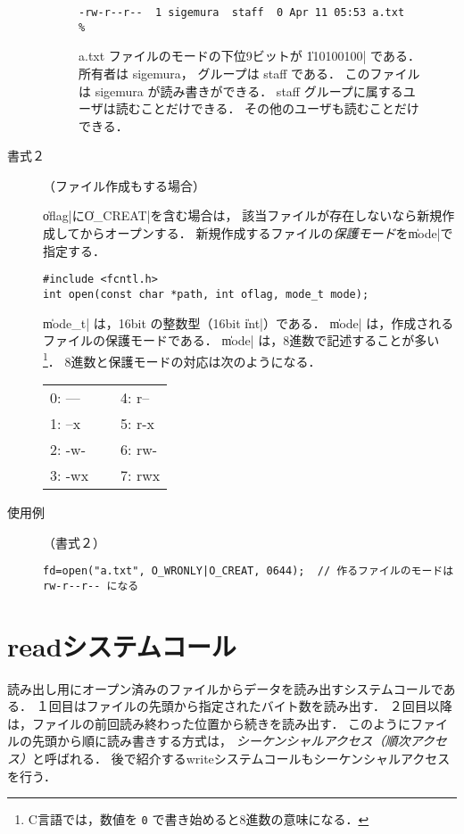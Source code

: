 \begin{description}
\begin{figure}[tb]
\begin{framed}
\begin{lstlisting}[numbers=none]
% ls -l a.txt
-rw-r--r--  1 sigemura  staff  0 Apr 11 05:53 a.txt
%
\end{lstlisting}

a.txt ファイルのモードの下位9ビットが \|110100100| である．
所有者は sigemura，
グループは staff である．
このファイルは sigemura が読み書きができる．
staff グループに属するユーザは読むことだけできる．
その他のユーザも読むことだけできる．
\end{framed}
\end{figure}

\item[書式２]（ファイル作成もする場合）

\|oflag|に\|O_CREAT|を含む場合は，
該当ファイルが存在しないなら新規作成してからオープンする．
新規作成するファイルの\emph{保護モード}を\|mode|で指定する．

\begin{lstlisting}[numbers=none]
#include <fcntl.h>
int open(const char *path, int oflag, mode_t mode);
\end{lstlisting}

\|mode_t| は，16bit の整数型（16bit \|int|）である．
\|mode| は，作成されるファイルの保護モードである．
\|mode| は，8進数で記述することが多い\footnote{
C言語では，数値を \texttt{0} で書き始めると8進数の意味になる．}．
8進数と保護モードの対応は次のようになる．

{\ttfamily\begin{center}\begin{tabular}{l l}
0: --- ~~~ & 4: r-- \\
1: --x     & 5: r-x \\
2: -w-     & 6: rw- \\
3: -wx     & 7: rwx
\end{tabular}\end{center}}

\item[使用例]（書式２）

\begin{lstlisting}[numbers=none]
fd=open("a.txt", O_WRONLY|O_CREAT, 0644);  // 作るファイルのモードは rw-r--r-- になる
\end{lstlisting}

\end{description}

\section{readシステムコール}
読み出し用にオープン済みのファイルからデータを読み出すシステムコールである．
１回目はファイルの先頭から指定されたバイト数を読み出す．
２回目以降は，ファイルの前回読み終わった位置から続きを読み出す．
このようにファイルの先頭から順に読み書きする方式は，
\emph{シーケンシャルアクセス（順次アクセス）}と呼ばれる．
後で紹介するwriteシステムコールもシーケンシャルアクセスを行う．

